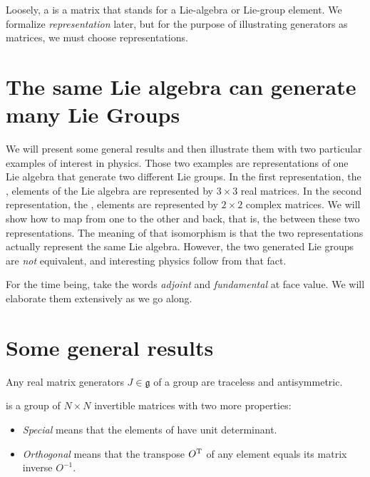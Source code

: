 Loosely, a  is a matrix that stands for a
Lie-algebra or Lie-group element. We formalize \textit{representation} later,
but for the purpose of illustrating generators as matrices, we must choose
representations.

\section{The same Lie algebra can generate many Lie Groups}

We will present some general results and then illustrate them with two
particular examples of interest in physics. Those two examples are
representations of one Lie algebra  that generate two different Lie
groups. In the first representation, the , elements
of the Lie algebra are represented by $3\times{}3$ real matrices. In the second
representation, the , elements are represented by
$2\times{}2$ complex matrices. We will show how to map from one to the other
and back, that is, the  between these two
representations. The meaning of that isomorphism is that the two
representations actually represent the same Lie algebra. However, the two
generated Lie groups are \textit{not} equivalent, and interesting physics
follow from that fact.

For the time being, take the words \textit{adjoint} and \textit{fundamental} at
face value. We will elaborate them extensively as we go along.

\section{Some general results}

\begin{proposition}
    \label{prop:traceless-antisymmetric}
    Any real matrix generators $J\in\mathfrak{g}$ of a 
     group  are traceless and antisymmetric.
\end{proposition}

\begin{remark}
     is a group of $N\times{}N$ invertible matrices with two more
    properties:
    \begin{itemize}
        \item \textit{Special} means that the elements of  have unit determinant. 
        \item \textit{Orthogonal} means that the transpose $O^{\mathrm{T}}$ of any
            element equals its matrix inverse $O^{-1}$.
    \end{itemize}
\end{remark}

